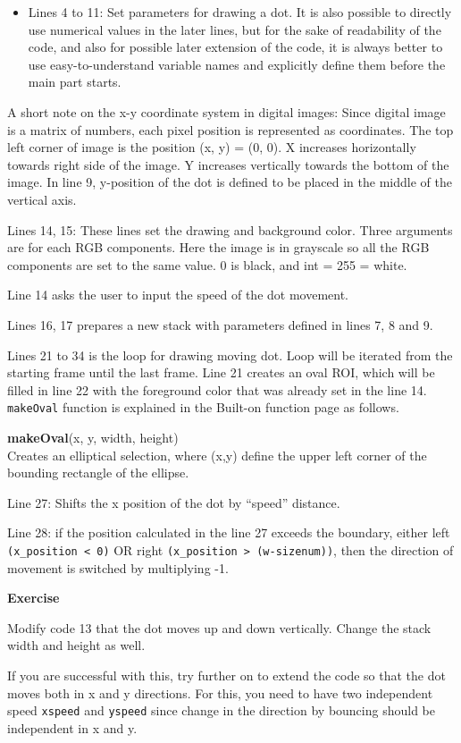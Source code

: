 \documentclass[11pt,a4paper,oneside]{report}
\newenvironment{indentexercise}[1]%
{{\setlength{\leftmargin}{2em}}%
\textbf{Exercise \thesubsection-#1}%
\begin{list}{}%
	\item%
}
{\end{list}}
\newenvironment{indentCom}%
{\begin{list}{}%
         {\setlength{\leftmargin}{1em}}%
         \item[]%
}
{\end{list}}
\newcommand{\ilcom}[1]{\texttt{\small#1}}
\begin{document}
\begin{itemize}
\item Lines 4 to 11: Set parameters for drawing a dot. It is also possible to directly use numerical values in the later lines, but for the sake of readability of the code, and also for possible later extension of the code, it is always better to use easy-to-understand variable names and explicitly define them before the main part starts. 
\end{itemize}
A short note on the x-y coordinate system in digital images: Since digital image is a matrix of numbers, each pixel position is represented as coordinates. The top left corner of image is the position (x, y) = (0, 0). X increases horizontally towards right side of the image. Y increases vertically towards the bottom of the image.  In line 9, y-position of the dot is defined to be placed in the middle of the vertical axis. 
\begin{itemize}
\item Lines 14, 15: These lines set the drawing and background color. Three arguments are for each RGB components. Here the image is in grayscale so all the RGB components are set to the same value. 0 is black, and int = 255 = white.
\item Line 14 asks the user to input the speed of the dot movement.
\item Lines 16, 17 prepares a new stack with parameters defined in lines 7, 8 and 9.
\item Lines 21 to 34 is the loop for drawing moving dot. Loop will be iterated from the starting frame until the last frame. Line 21 creates an oval ROI, which will be filled in line 22 with the foreground color that was already set in the line 14. \ilcom{makeOval} function is explained in the Built-on function page as follows.

\begin{indentCom}
\textbf{makeOval}(x, y, width, height)\\
Creates an elliptical selection, where (x,y) define the upper left corner of the bounding rectangle of the ellipse. 
\end{indentCom}
\item Line 27: Shifts the x position of the dot by ``speed'' distance. 
\item Line 28: if the position calculated in the line 27 exceeds the boundary, either left \ilcom{(x\_position < 0)} OR right \ilcom{(x\_position > (w-sizenum))}, then the direction of movement is switched by multiplying -1.
\end{itemize}
\begin{indentexercise}{2}
Modify code 13 that the dot moves up and down vertically. Change the stack width and height as well. 

If you are successful with this, try further on to extend the code so that the dot moves both in x and y directions. For this, you need to have two independent speed \ilcom{xspeed} and \ilcom{yspeed} since change in the direction by bouncing should be independent in x and y. 
\end{indentexercise}
\end{document}
